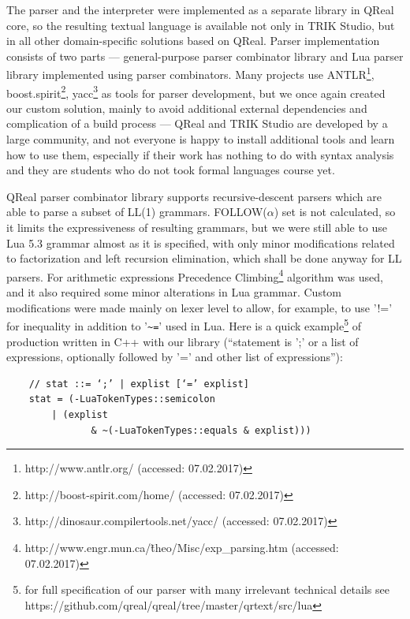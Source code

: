 \documentclass[conference]{IEEEtran}
\begin{document}
The parser and the interpreter were implemented as a separate library in QReal core, so the resulting textual language is available not only in TRIK Studio, but in all other domain-specific solutions based on QReal. Parser implementation consists of two parts --- general-purpose parser combinator library and Lua parser library implemented using parser combinators. Many projects use ANTLR\footnote{http://www.antlr.org/ (accessed: 07.02.2017)}, boost.spirit\footnote{http://boost-spirit.com/home/ (accessed: 07.02.2017)}, yacc\footnote{http://dinosaur.compilertools.net/yacc/ (accessed: 07.02.2017)} as tools for parser development, but we once again created our custom solution, mainly to avoid additional external dependencies and complication of a build process --- QReal and TRIK Studio are developed by a large community, and not everyone is happy to install additional tools and learn how to use them, especially if their work has nothing to do with syntax analysis and they are students who do not took formal languages course yet.

QReal parser combinator library supports recursive-descent parsers which are able to parse a subset of LL(1) grammars. FOLLOW($\alpha$) set is not calculated, so it limits the expressiveness of resulting grammars, but we were still able to use Lua 5.3 grammar almost as it is specified, with only minor modifications related to factorization and left recursion elimination, which shall be done anyway for LL parsers. For arithmetic expressions Precedence Climbing\footnote{http://www.engr.mun.ca/\~theo/Misc/exp\_parsing.htm (accessed: 07.02.2017)} algorithm was used, and it also required some minor alterations in Lua grammar. Custom modifications were made mainly on lexer level to allow, for example, to use '!=' for inequality in addition to '\verb|~=|' used in Lua. Here is a quick example\footnote{for full specification of our parser with many irrelevant technical details see https://github.com/qreal/qreal/tree/master/qrtext/src/lua} of production written in C++ with our library (``statement is ';' or a list of expressions, optionally followed by '=' and other list of expressions''):
\begin{verbatim}
	// stat ::= ‘;’ | explist [‘=’ explist]
	stat = (-LuaTokenTypes::semicolon 
	    | (explist 
			   & ~(-LuaTokenTypes::equals & explist)))
\end{verbatim}
\end{document}
